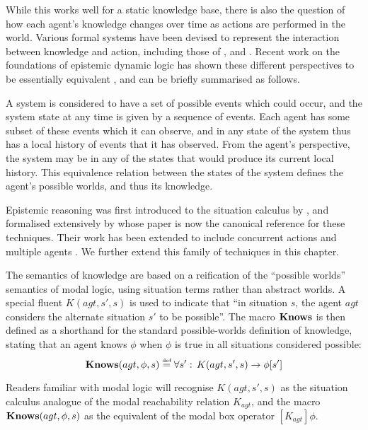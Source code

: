 While this works well for a static knowledge base, there is also the
question of how each agent's knowledge changes over time as actions
are performed in the world. Various formal systems have been devised
to represent the interaction between knowledge and action, including
those of \citep{fagin95}, \citep{parikh85dist_knowledge} and \citep{baltag98pa_ck}.
Recent work on the foundations of epistemic dynamic logic has shown
these different perspectives to be essentially equivalent \citep{vanBentham06tree_of_knowledge,pacuit07history_structures},
and can be briefly summarised as follows.

A system is considered to have a set of possible events which could
occur, and the system state at any time is given by a sequence of
events. Each agent has some subset of these events which it can observe,
and in any state of the system thus has a local history of events
that it has observed. From the agent's perspective, the system may
be in any of the states that would produce its current local history.
This equivalence relation between the states of the system defines
the agent's possible worlds, and thus its knowledge.

Epistemic reasoning was first introduced to the situation calculus
by \citet{moore80know_act}, and formalised extensively by \citet{scherl03sc_knowledge}
whose paper is now the canonical reference for these techniques. Their
work has been extended to include concurrent actions \citep{scherl03conc_knowledge}
and multiple agents \citep{shapiro98specifying_ma_systems}. We further
extend this family of techniques in this chapter.

The semantics of knowledge are based on a reification of the {}``possible
worlds'' semantics of modal logic, using situation terms rather than
abstract worlds. A special fluent $K(agt,s',s)$ is used to indicate
that {}``in situation $s$, the agent $agt$ considers the alternate
situation $s'$ to be possible''. The macro $\mathbf{Knows}$ is then defined
as a shorthand for the standard possible-worlds definition of knowledge,
stating that an agent knows $\phi$ when $\phi$ is true in all situations
considered possible: \begin{equation}
\mathbf{Knows}(agt,\phi,s)\stackrel{\mbox{\tiny def}}{=}\forall s':\, K(agt,s',s)\rightarrow\phi[s']\label{eqn:Knowledge:knows_def}\end{equation}


Readers familiar with modal logic will recognise $K(agt,s',s)$ as
the situation calculus analogue of the modal reachability relation
$K_{agt}$, and the macro $\mathbf{Knows}(agt,\phi,s)$ as the equivalent
of the modal box operator $[K_{agt}]\phi$.

